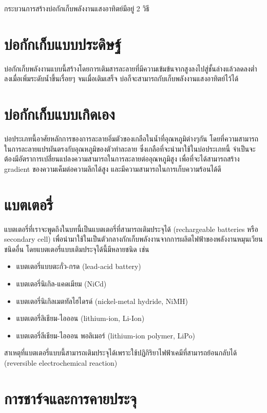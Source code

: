\documentclass[a4paper,nobib,openany]{tufte-book}
\begin{document}
กระบวนการสร้างบ่อกักเก็บพลังงานแสงอาทิตย์มีอยู่ 2 วิธี

\section{บ่อกักเก็บแบบประดิษฐ์}
\label{sec:org143e4af}
บ่อกักเก็บพลังงานแบบนี้สร้างโดยการเติมสารละลายที่มีความเข้มข้นจากสูงลงไปสู่ชั้นล่างแล้วลดลงต่ำลงเมื่อเพิ่มระดับน้ำขึ้นเรื่อยๆ
จนเมื่อเติมเสร็จ บ่อก็จะสามารถกับเก็บพลังงานแสงอาทิตย์ไว้ได้

\section{บ่อกักเก็บแบบเกิดเอง}
\label{sec:orgd56895c}
บ่อประเภทนี้อาศัยหลักการของการละลายอิ่มตัวของเกลือในน้ำที่อุณหภูมิต่างๆกัน
โดยที่ความสามารถในการละลายแปรผันตรงกับอุณหภูมิของตัวทำละลาย
ซึ่งเกลือที่จะนำมาใช้ในบ่อประเภทนี้
จำเป็นจะต้องมีอัตราการเปลี่่ยนแปลงความสามารถในการละลายต่ออุณหภูมิสูง
เพื่อที่จะได้สามารถสร้าง gradient ของความเค็มต่อความลึกได้สูง
และมีความสามารถในการเก็บความร้อนได้ดี

\section{แบตเตอรี่}
\label{sec:orga90d61e}

แบตเตอรี่ที่เราจะพูดถึงในบทนี้เป็นแบตเตอรี่ที่สามารถเติมประจุได้ (rechargeable batteries หรือ secondary cell) เพื่อนำมาใช้ในเป็นตัวกลางกักเก็บพลังงานจากการผลิตไฟฟ้าของพลังงานหมุนเวียนชนิดอื่น โดยแบตเตอรี่แบบเติมประจุได้นี้มีหลายชนิด เช่น

\begin{itemize}
\item แบตเตอรี่แบบตะกั่ว-กรด (lead-acid battery)
\item แบตเตอรี่นิเกิล-แคดเมียม (NiCd)
\item แบตเตอรี่นิเกิลเมตทัลไฮไดรด์ (nickel-metal hydride, NiMH)
\item แบตเตอรี่ลิเธียม-ไอออน (lithium-ion, Li-Ion)
\item แบตเตอรี่ลีเธียม-ไอออน พอลิเมอร์ (lithium-ion polymer, LiPo)
\end{itemize}

สาเหตุที่แบตเตอรี่แบบนี้สามารถเติมประจุได้เพราะใช้ปฏิกิริยาไฟฟ้าเคมีที่สามารถย้อนกลับได้ (reversible electrochemical reaction)

\section{การชาร์จและการคายประจุ}
\label{sec:orga888d2e}
\end{document}
